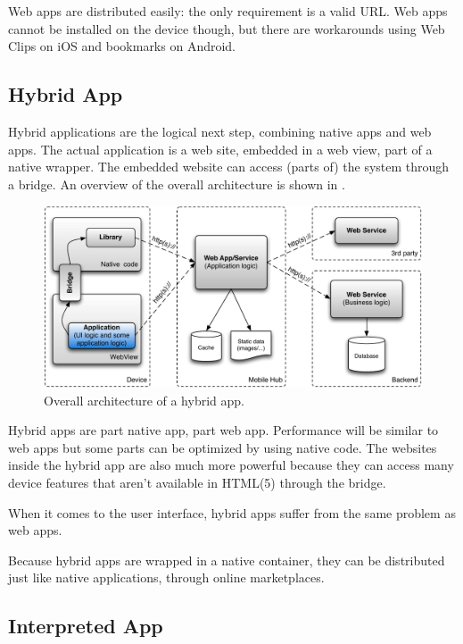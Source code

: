 \npar Web apps are distributed easily: the only requirement is a valid URL. Web apps cannot be installed on the device though, but there are workarounds using Web Clips on iOS \citep{Safari:webclips} and bookmarks on Android. 

\subsection{Hybrid App}

\npar Hybrid applications are the logical next step, combining native apps and web apps. The actual application is a web site, embedded in a web view, part of a native wrapper. The embedded website can access (parts of) the system through a bridge. An overview of the overall architecture is shown in . 

\begin{figure}[h!]
    \begin{center}
        \includegraphics[width=\textwidth]{figs/hybrid.pdf}
        \caption{
            Overall architecture of a hybrid app.
        }
        \label{fig:hybrid}
    \end{center}
\end{figure}

\npar Hybrid apps are part native app, part web app. Performance will be similar to web apps but some parts can be optimized by using native code. The websites inside the hybrid app are also much more powerful because they can access many device features that aren't available in HTML(5) through the bridge.

\npar When it comes to the user interface, hybrid apps suffer from the same problem as web apps. 

\npar Because hybrid apps are wrapped in a native container, they can be distributed just like native applications, through online marketplaces. 

\subsection{Interpreted App}

